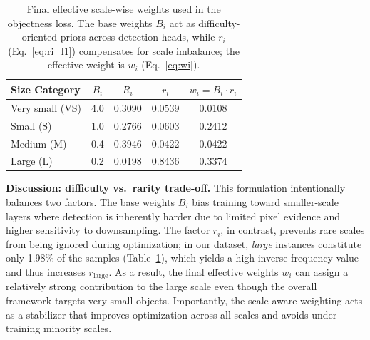 \documentclass[preprint,review,12pt]{elsarticle}
\begin{document}
\begin{table}[h]
\centering
\begin{tabular}{|l|c|c|c|c|}
\hline
\textbf{Size Category} & \(B_i\) & \(R_i\) & \(r_i\) & \(w_i = B_i \cdot r_i\) \\ \hline
Very small (VS) & 4.0 & 0.3090 & 0.0539 & 0.0108 \\ \hline
Small (S)       & 1.0 & 0.2766 & 0.0603 & 0.2412 \\ \hline
Medium (M)      & 0.4 & 0.3946 & 0.0422 & 0.0422 \\ \hline
Large (L)       & 0.2 & 0.0198 & 0.8436 & 0.3374 \\ \hline
\end{tabular}
\vspace{0.2cm}
\caption{Final effective scale-wise weights used in the objectness loss. The base weights \(B_i\) act as difficulty-oriented priors across detection heads, while \(r_i\) (Eq.~\eqref{eq:ri_l1}) compensates for scale imbalance; the effective weight is \(w_i\) (Eq.~\eqref{eq:wi}).}
\label{tab:effective_weights}
\end{table}

\begin{highlightbox}

\vspace{0.5ex}
\noindent\textbf{Discussion: difficulty vs.\ rarity trade-off.}
This formulation intentionally balances two factors. The base weights \(B_i\) bias training toward smaller-scale layers where detection is inherently harder due to limited pixel evidence and higher sensitivity to downsampling. The factor \(r_i\), in contrast, prevents rare scales from being ignored during optimization; in our dataset, \emph{large} instances constitute only 1.98\% of the samples (Table~\ref{tab:effective_weights}), which yields a high inverse-frequency value and thus increases \(r_{\text{large}}\). As a result, the final effective weights \(w_i\) can assign a relatively strong contribution to the large scale even though the overall framework targets very small objects. Importantly, the scale-aware weighting acts as a stabilizer that improves optimization across all scales and avoids under-training minority scales.

\end{highlightbox}
\end{document}
